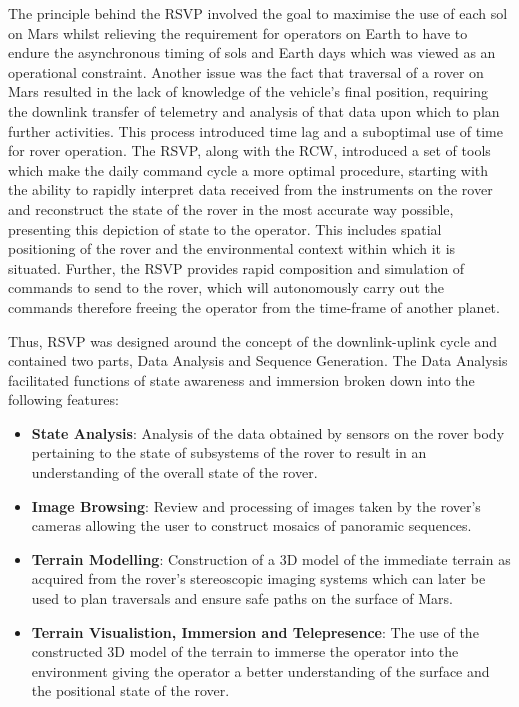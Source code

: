      The principle behind the RSVP involved the goal to maximise the use of each sol on Mars whilst relieving the requirement for operators on Earth to have to endure the asynchronous timing of sols and Earth days which was viewed as an operational constraint. Another issue was the fact that traversal of a rover on Mars resulted in the lack of knowledge of the vehicle's final position, requiring the downlink transfer of telemetry and analysis of that data upon which to plan further activities. This process introduced time lag and a suboptimal use of time for rover operation. The RSVP, along with the RCW, introduced a set of tools which make the daily command cycle a more optimal procedure, starting with the ability to rapidly interpret data received from the instruments on the rover and reconstruct the state of the rover in the most accurate way possible, presenting this depiction of state to the operator. This includes spatial positioning of the rover and the environmental context within which it is situated. Further, the RSVP provides rapid composition and simulation of commands to send to the rover, which will autonomously carry out the commands therefore freeing the operator from the time-frame of another planet.
      
      Thus, RSVP was designed around the concept of the downlink-uplink cycle and contained two parts, Data Analysis and Sequence Generation. The Data Analysis facilitated functions of state awareness and immersion broken down into the following features:
      \begin{itemize}
        \item \textbf{State Analysis}: Analysis of the data obtained by sensors on the rover body pertaining to the state of subsystems of the rover to result in an understanding of the overall state of the rover.
        \item \textbf{Image Browsing}: Review and processing of images taken by the rover's cameras allowing the user to construct mosaics of panoramic sequences.
        \item \textbf{Terrain Modelling}: Construction of a 3D model of the immediate terrain as acquired from the rover's stereoscopic imaging systems which can later be used to plan traversals and ensure safe paths on the surface of Mars.
        \item \textbf{Terrain Visualistion, Immersion and Telepresence}: The use of the constructed 3D model of the terrain to immerse the operator into the environment giving the operator a better understanding of the surface and the positional state of the rover.
      \end{itemize}
      
